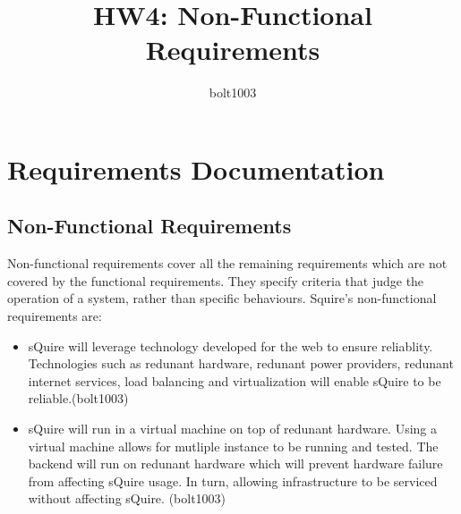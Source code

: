 \documentclass[11pt]{report}
\title{HW4: Non-Functional Requirements}
\author{bolt1003}
\begin{document}
\maketitle


\chapter{Requirements Documentation}

\section{Non-Functional Requirements}
    Non-functional requirements cover all the remaining requirements which are not covered by the functional requirements. They specify criteria that judge the operation of a system, rather than specific behaviours. Squire's non-functional requirements are:
    \begin{itemize}
         \item sQuire will leverage technology developed for the web to ensure reliablity. Technologies such as redunant hardware, redunant power providers, redunant internet services, load balancing and virtualization will enable sQuire to be reliable.(bolt1003)
         \item sQuire will run in a virtual machine on top of redunant hardware. Using a virtual machine allows for mutliple instance to be running and tested. The backend will run on redunant hardware which will prevent hardware failure from affecting sQuire usage. In turn, allowing infrastructure to be serviced without affecting sQuire. (bolt1003)

    \end{itemize}
\end{document}
